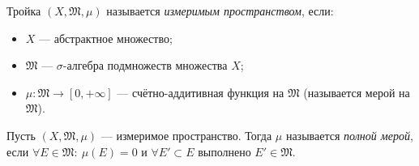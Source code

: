 \begin{definition}
    Тройка $(X, \mathfrak{M}, \mu)$ называется \textit{измеримым пространством}, если:
    \begin{itemize}
        \item $X$ — абстрактное множество;
        \item $\mathfrak{M}$ — $\sigma$-алгебра подмножеств множества $X$;
        \item $\mu: \mathfrak{M} \to [0, +\infty]$ — счётно-аддитивная функция на $\mathfrak{M}$ (называется мерой на $\mathfrak{M}$).
    \end{itemize}
\end{definition} 

\begin{definition}
    Пусть $(X, \mathfrak{M}, \mu)$ — измеримое пространство.
    Тогда $\mu$ называется \textit{полной мерой}, если $\forall E \in \mathfrak{M}: \ \mu(E) = 0$ и $\forall E' \subset E$ выполнено $E' \in \mathfrak{M}$.
\end{definition} 

